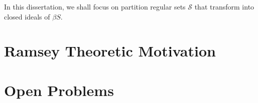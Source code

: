\documentclass[12pt]{article}
\theoremstyle{plain}
\theoremstyle{definition}
\newcommand{\calS}{\mathcal{S}}
\begin{document}
In this dissertation, we shall focus on partition regular sets $\calS$ that transform into closed ideals of $\beta S$. 

\section{Ramsey Theoretic Motivation}
\section*{Open Problems}

\theendnotes



\end{document}
